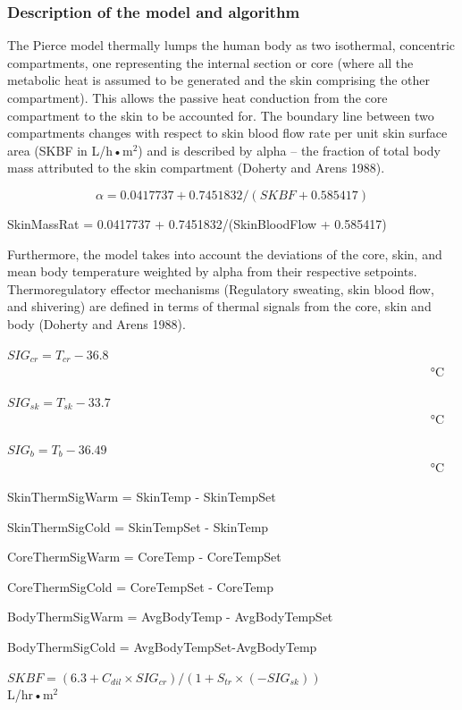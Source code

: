 \subsubsection{Description of the model and algorithm}\label{description-of-the-model-and-algorithm-1}

The Pierce model thermally lumps the human body as two isothermal, concentric compartments, one representing the internal section or core (where all the metabolic heat is assumed to be generated and the skin comprising the other compartment). This allows the passive heat conduction from the core compartment to the skin to be accounted for. The boundary line between two compartments changes with respect to skin blood flow rate per unit skin surface area (SKBF in L/h•m\(^{2}\)) and is described by alpha -- the fraction of total body mass attributed to the skin compartment (Doherty and Arens 1988).

\begin{equation}
\alpha  = 0.0417737 + 0.7451832/(SKBF + 0.585417)
\end{equation}

SkinMassRat = 0.0417737 + 0.7451832/(SkinBloodFlow + 0.585417)

Furthermore, the model takes into account the deviations of the core, skin, and mean body temperature weighted by alpha from their respective setpoints. Thermoregulatory effector mechanisms (Regulatory sweating, skin blood flow, and shivering) are defined in terms of thermal signals from the core, skin and body (Doherty and Arens 1988).

\(SI{G_{cr}} = {T_{cr}} - 36.8\) ~~~~~~~~~~~~~~~~~~~~~~~~~~~~~~~~~~~~~~~~~~~~~~~~~~~~~~~~~~~~~~~~~~~ °C

\(SI{G_{sk}} = {T_{sk}} - 33.7\) ~~~~~~~~~~~~~~~~~~~~~~~~~~~~~~~~~~~~~~~~~~~~~~~~~~~~~~~~~~~~~~~~~~~ °C

\(SI{G_b} = {T_b} - 36.49\) ~~~~~~~~~~~~~~~~~~~~~~~~~~~~~~~~~~~~~~~~~~~~~~~~~~~~~~~~~~~~~~~~~~~ °C

SkinThermSigWarm = SkinTemp - SkinTempSet

SkinThermSigCold = SkinTempSet - SkinTemp

CoreThermSigWarm = CoreTemp - CoreTempSet

CoreThermSigCold = CoreTempSet - CoreTemp

BodyThermSigWarm = AvgBodyTemp - AvgBodyTempSet

BodyThermSigCold = AvgBodyTempSet-AvgBodyTemp

\(SKBF = (6.3 + C{}_{dil} \times SI{G_{cr}})/(1 + {S_{tr}} \times ( - SI{G_{sk}}))\) ~~~~~~~~~~~~~~~~~~~~~ L/hr•m\(^{2}\)

